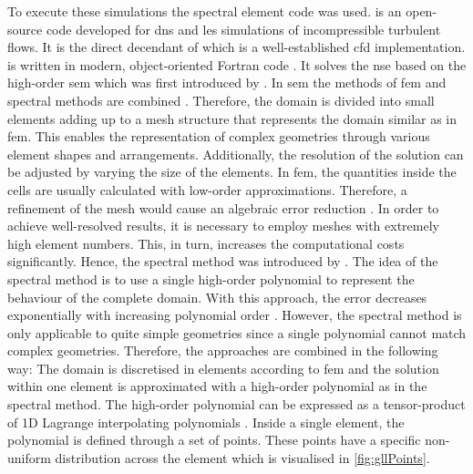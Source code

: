 To execute these simulations the spectral element code  was used. 
 is an open-source code developed for \acrshort{dns} and \acrshort{les} simulations of incompressible turbulent flows.
It is the direct decendant of  which is a well-established \acrfull{cfd} implementation.
 is written in modern, object-oriented Fortran code \citep{jansson_neko_2024}.
It solves the \acrshort{nse} based on the high-order \acrfull{sem} which was first introduced by \citet{patera_spectral_1984}.
In \acrshort{sem} the methods of \acrshort{fem} and spectral methods are combined \citep{patera_spectral_1984}.
Therefore, the domain is divided into small elements adding up to a mesh structure that represents the domain similar as in \acrshort{fem}.
This enables the representation of complex geometries through various element shapes and arrangements.
Additionally, the resolution of the solution can be adjusted by varying the size of the elements.
In \acrshort{fem}, the quantities inside the cells are  usually calculated with low-order approximations.
Therefore, a refinement of the mesh would cause an algebraic error reduction \citep{deville_high-order_2002}. 
In order to achieve well-resolved results, it is necessary to employ meshes with extremely high element numbers. This, in turn, increases the  computational costs significantly.
Hence, the spectral method was introduced by \citep{patera_spectral_1984}.
The idea of the spectral method is to use a single high-order polynomial to represent the behaviour of the complete domain.
With this approach, the error decreases exponentially with increasing polynomial order \citep{deville_high-order_2002}.
However, the spectral method is only applicable to quite simple geometries since a single polynomial cannot match complex geometries.
Therefore, the approaches are combined in the following way:
The domain is discretised in elements according to \acrshort{fem} and the solution within one element is approximated with a high-order polynomial as in the spectral method.
The high-order polynomial can be expressed as a tensor-product of 1D Lagrange interpolating polynomials \citep{deville_high-order_2002}.
Inside a single element, the polynomial is defined through a set of points.
These  points have a specific non-uniform distribution across the element which is visualised in \autoref{fig:gllPoints}.
